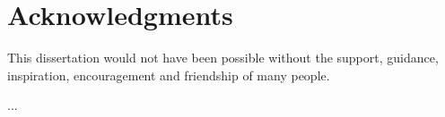 \chapter*{Acknowledgments}


This dissertation would not have been possible without the support, guidance, inspiration, encouragement and friendship of many people.

...

\clearpage
